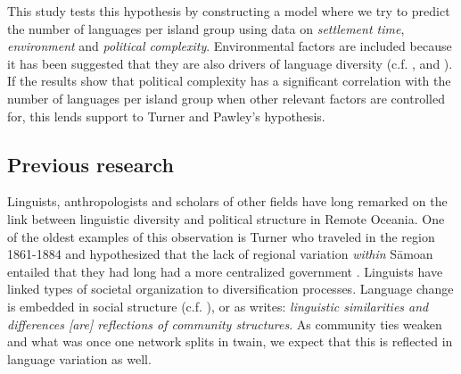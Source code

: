 \documentclass[a4paper,10pt]{article} %
\begin{document}
This study tests this hypothesis by constructing a model where we try to predict the number of languages per island group using data on \textit{settlement time}, \textit{environment} and \textit{political complexity}. Environmental factors are included because it has been suggested that they are also drivers of language diversity (c.f. \citet{NETTLE1998}, \citet{gavin2012island} and \citet{hua2019ecological}). If the results show that political complexity has a significant correlation with the number of languages per island group when other relevant factors are controlled for, this lends support to Turner and Pawley's hypothesis.
 


 
 
\subsection{Previous research}
\label{nonlingfactors}
Linguists, anthropologists and scholars of other fields have long remarked on the link between linguistic diversity and political structure in Remote Oceania. One of the oldest examples of this observation is Turner who traveled in the region 1861-1884 and hypothesized that the lack of regional variation \emph{within} S\={a}moan entailed that they had long had a more centralized government \citep[172]{turner1884}. Linguists have linked types of societal organization to diversification processes. Language change is embedded in social structure (c.f. \citep{WLH1968}), or as \citet[124]{grace_1992_aberrant} writes: \emph{linguistic similarities and differences [are] reflections of community structures}. As community ties weaken and what was once one network splits in twain, we expect that this is reflected in language variation as well.
\end{document}
